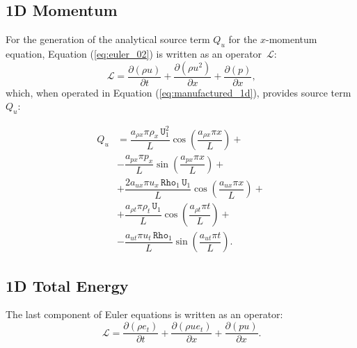 \documentclass[10pt]{article}
\newcommand{\Diff}[2] {\dfrac{\partial( #1)}{\partial #2}}
\newcommand{\Rho}{\,\mathtt{Rho}}
\newcommand{\U}{\,\mathtt{U}}
\newcommand{\Lo}{\,\mathcal{L}}
\begin{document}
\subsection{1D Momentum}

For the generation of the analytical source term $Q_u$ for the $x$-momentum equation, Equation  (\ref{eq:euler_02}) is written as an  operator $\Lo$:
\begin{equation*}
 \Lo=\Diff{\rho u}{t} + \Diff{\rho u^2 }{x}+ \Diff{p}{x},
\end{equation*}
which, when operated in Equation (\ref{eq:manufactured_1d}), provides source term $Q_{u}$:

\begin{equation}
 \begin{split}
Q_u&=\dfrac{a_{\rho x} \pi \rho_x \U_1^2}{L}\cos\left(\dfrac{a_{\rho x} \pi x}{L}\right) +\\
&-\dfrac{ a_{px} \pi p_x}{L}\sin\left(\dfrac{a_{px} \pi x}{L}\right) +\\
&+ \dfrac{2a_{ux} \pi u_x \Rho_1 \U_1}{L}\cos\left(\dfrac{a_{ux} \pi x}{L}\right)+\\
&+ \dfrac{a_{\rho t} \pi \rho_t \U_1}{L}\cos\left(\dfrac{a_{\rho t} \pi t}{L}\right) +\\
&-\dfrac{a_{ut} \pi u_t \Rho_1}{L}\sin\left(\dfrac{a_{ut} \pi t}{L}\right).
 \end{split}
\end{equation}



\subsection{1D Total Energy}


The last component of Euler equations is written as an operator:
\begin{equation*}
 \Lo=\Diff{\rho e_t}{t} + \Diff{\rho ue_t }{x}+\Diff{pu}{x} .
\end{equation*}
\end{document}
